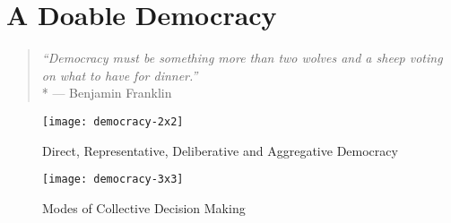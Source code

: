
\chapter[Doable Democracy]{A Doable Democracy} \label{chap:doable-democracy}

\begin{quote}
	\emph{``Democracy must be something more than two wolves and a sheep voting on what to have for dinner.''}
	\\*
	--- Benjamin Franklin
\end{quote}






 \begin{figure}[htbp]
	\centering
	\texttt{[image: democracy-2x2]}
	\caption{Direct, Representative, Deliberative and Aggregative Democracy}
	\label{fig:democracy-2x2}
\end{figure}

 \begin{figure}[htbp]
	\centering
	\texttt{[image: democracy-3x3]}
	\caption{Modes of Collective Decision Making}
	\label{fig:democracy-3x3}
\end{figure}

